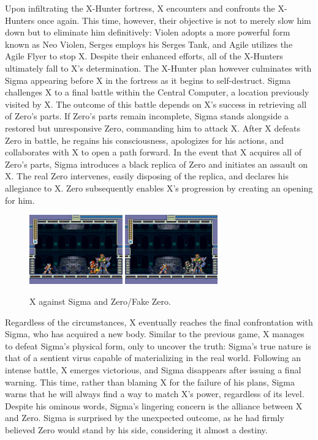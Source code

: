 Upon infiltrating the X-Hunter fortress, X encounters and confronts the X-Hunters once again. This time, however, their objective is not to merely slow him down but to eliminate him definitively: Violen adopts a more powerful form known as Neo Violen, Serges employs his Serges Tank, and Agile utilizes the Agile Flyer to stop X. Despite their enhanced efforts, all of the X-Hunters ultimately fall to X's determination. The X-Hunter plan however culminates with Sigma appearing before X in the fortress as it begins to self-destruct. Sigma challenges X to a final battle within the Central Computer, a location previously visited by X. The outcome of this battle depends on X's success in retrieving all of Zero's parts.
If Zero's parts remain incomplete, Sigma stands alongside a restored but unresponsive Zero, commanding him to attack X. After X defeats Zero in battle, he regains his consciousness, apologizes for his actions, and collaborates with X to open a path forward. In the event that X acquires all of Zero's parts, Sigma introduces a black replica of Zero and initiates an assault on X. The real Zero intervenes, easily disposing of the replica, and declares his allegiance to X. Zero subsequently enables X's progression by creating an opening for him.

\begin{figure}[htp]
	\centering
	\includegraphics[height=3cm]{figures/X2/story_3_2.jpg}
	\includegraphics[height=3cm]{figures/X2/story_3.jpg}
	\caption{X against Sigma and Zero/Fake Zero.}
\end{figure}

Regardless of the circumstances, X eventually reaches the final confrontation with Sigma, who has acquired a new body. Similar to the previous game, X manages to defeat Sigma's physical form, only to uncover the truth: Sigma's true nature is that of a sentient virus capable of materializing in the real world. Following an intense battle, X emerges victorious, and Sigma disappears after issuing a final warning. This time, rather than blaming X for the failure of his plans, Sigma warns that he will always find a way to match X's power, regardless of its level. Despite his ominous words, Sigma's lingering concern is the alliance between X and Zero. Sigma is surprised by the unexpected outcome, as he had firmly believed Zero would stand by his side, considering it almost a destiny.

